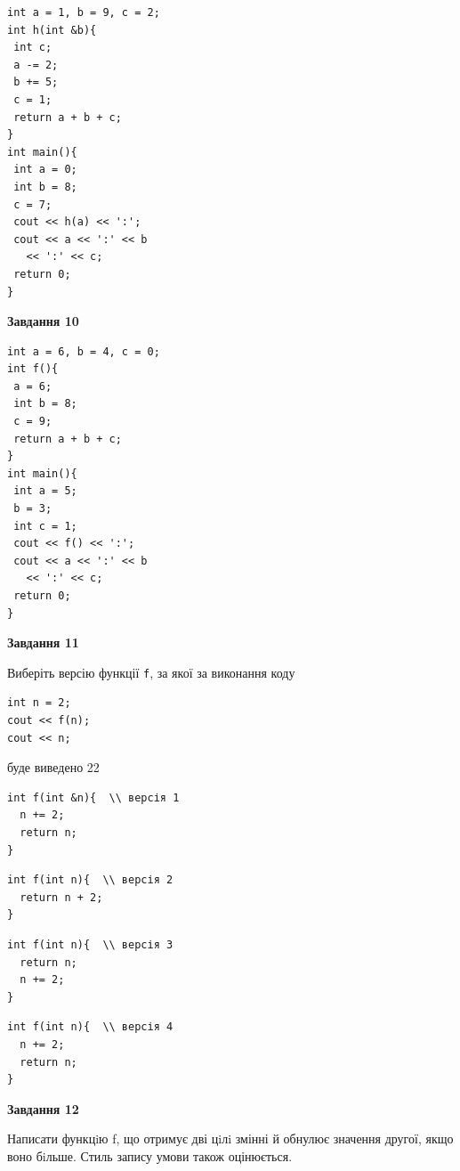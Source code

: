 \documentclass[12pt, ukrainian]{article}
\def\code#1{\Verb!#1!}
\begin{document}
{\begin {large}
\begin{minipage}[t]{7.0cm}
\begin{verbatim}
int a = 1, b = 9, c = 2;
int h(int &b){
 int c;
 a -= 2;
 b += 5;
 c = 1;
 return a + b + c;
}
int main(){
 int a = 0;
 int b = 8;
 c = 7;
 cout << h(a) << ':';
 cout << a << ':' << b 
   << ':' << c;
 return 0;
}
\end{verbatim}



\begin{center}
\textbf{Завдання 10}
\end{center}
\vspace{-8mm}

\begin{verbatim}
int a = 6, b = 4, c = 0;
int f(){
 a = 6;
 int b = 8;
 c = 9;
 return a + b + c;
}
int main(){
 int a = 5;
 b = 3;
 int c = 1;
 cout << f() << ':';
 cout << a << ':' << b 
   << ':' << c;
 return 0;
}
\end{verbatim}

\end{minipage}
\vline \hspace{1mm}
\begin{minipage}[t]{11.0cm}

\begin{center}
\textbf{Завдання 11}
\end{center}
Виберіть версію функції \code{f}, за якої за виконання коду
\begin{verbatim}
int n = 2;
cout << f(n);
cout << n;
\end{verbatim}

буде виведено 22

\begin{verbatim}
int f(int &n){  \\ версія 1
  n += 2;
  return n;
}
\end{verbatim}

\vspace{-8mm}\begin{verbatim}
int f(int n){  \\ версія 2
  return n + 2;
}
\end{verbatim}

\vspace{-8mm}\begin{verbatim}
int f(int n){  \\ версія 3
  return n;
  n += 2;
}
\end{verbatim}

\vspace{-8mm}\begin{verbatim}
int f(int n){  \\ версія 4
  n += 2;
  return n;
}
\end{verbatim}



\begin{center}
\textbf{Завдання 12}
\end{center}

Написати функцiю f, що отримує дві цiлi змінні й обнулює значення другої, якщо воно бiльше. Стиль запису умови також оцінюється.\par

\end{minipage}

\end {large}}
\end{document}
